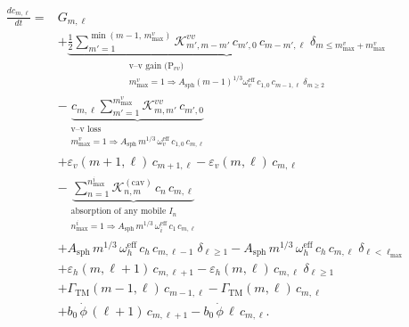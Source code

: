 \begin{equation}\label{eq:ME_vac}
\boxed{
\begin{split}
\frac{dc_{m,\ell}}{dt} = {} &
  G_{m,\ell}
  \\[4pt]
  &+ \underbrace{
     \frac{1}{2}\sum_{m'=1}^{\min(m-1,\,m_{\max}^v)}
     \mathcal{K}_{m',m-m'}^{vv}\,c_{m',0}\,c_{m-m',\ell}
     \;\delta_{m \leq m_{\max}^v+m_{\max}^v}
     }_{\substack{\text{v--v gain (P$_{vv}$)}\\
                  m_{\max}^v=1 \Rightarrow A_{\mathrm{sph}}(m{-}1)^{1/3}\omega_v^{\mathrm{eff}}
                  \,c_{1,0}\,c_{m-1,\ell}\;\delta_{m\geq 2}}}
  \\[4pt]
  &- \underbrace{
     c_{m,\ell}\sum_{m'=1}^{m_{\max}^v}
     \mathcal{K}_{m,m'}^{vv}\,c_{m',0}
     }_{\substack{\text{v--v loss}\\
                  m_{\max}^v=1 \Rightarrow A_{\mathrm{sph}}\,m^{1/3}\,\omega_v^{\mathrm{eff}}
                  \,c_{1,0}\,c_{m,\ell}}}
  \\[4pt]
  &+ \varepsilon_v(m{+}1,\ell)\,c_{m+1,\ell}
   - \varepsilon_v(m,\ell)\,c_{m,\ell}
  \\[4pt]
  &- \underbrace{
     \sum_{n=1}^{n_{\max}^i}
     \mathcal{K}_{n,m}^{(\mathrm{cav})}\,c_n\,c_{m,\ell}
     }_{\substack{\text{absorption of any mobile }I_n\\
                  n_{\max}^i=1 \Rightarrow A_{\mathrm{sph}}\,m^{1/3}\,
                  \omega_i^{\mathrm{eff}}\,c_1\,c_{m,\ell}}}
  \\[4pt]
  &+ A_{\mathrm{sph}}\,m^{1/3}\,\omega_h^{\mathrm{eff}}\,
     c_h\,c_{m,\ell-1}\;\delta_{\ell \geq 1}
  - A_{\mathrm{sph}}\,m^{1/3}\,\omega_h^{\mathrm{eff}}\,
     c_h\,c_{m,\ell}\;\delta_{\ell < \ell_{\max}}
  \\[4pt]
  &+ \varepsilon_h(m,\ell{+}1)\,c_{m,\ell+1}
   - \varepsilon_h(m,\ell)\,c_{m,\ell}\;\delta_{\ell \geq 1}
  \\[4pt]
  &+ \Gamma_{\mathrm{TM}}(m{-}1,\ell)\,c_{m-1,\ell}
   - \Gamma_{\mathrm{TM}}(m,\ell)\,c_{m,\ell}
  \\[4pt]
  &+ b_0\,\dot{\phi}\,(\ell{+}1)\,c_{m,\ell+1}
   - b_0\,\dot{\phi}\,\ell\,c_{m,\ell}.
\end{split}
}
\end{equation}


